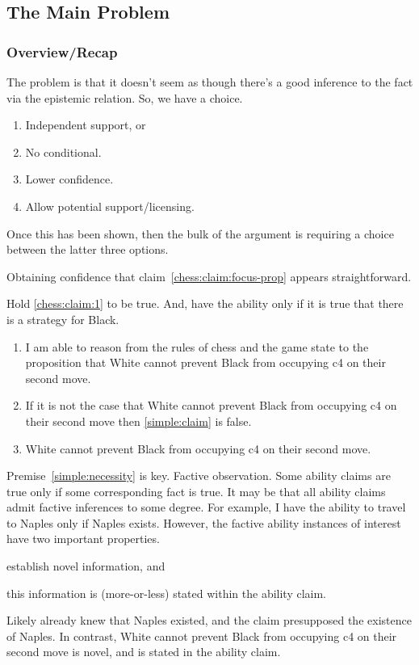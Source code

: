 \documentclass[10pt]{article}
\begin{document}
\subsection{The Main Problem}
\label{sec:problem}

\subsubsection{Overview/Recap}
\label{sec:overviewrecap}

\begin{note}[Overview]
  The problem is that it doesn't seem as though there's a good inference to the fact via the epistemic relation.
  So, we have a choice.
  \begin{enumerate}
  \item Independent support, or
  \item No conditional.
  \item Lower confidence.
  \item Allow potential support/licensing.
  \end{enumerate}
  Once this has been shown, then the bulk of the argument is requiring a choice between the latter three options.
\end{note}

Obtaining confidence that claim~\ref{chess:claim:focus-prop} appears straightforward.

Hold \ref{chess:claim:1} to be true.
And, have the ability only if it is true that there is a strategy for Black.

\begin{enumerate}
\item\label{simple:claim} I am able to reason from the rules of chess and the game state to the proposition that White cannot prevent Black from occupying c4 on their second move.
\item\label{simple:necessity} If it is not the case that White cannot prevent Black from occupying c4 on their second move then \ref{simple:claim} is false.
\item\label{simple:focus} White cannot prevent Black from occupying c4 on their second move.
\end{enumerate}

Premise~\ref{simple:necessity} is key.
Factive observation.
Some ability claims are true only if some corresponding fact is true.
It may be that all ability claims admit factive inferences to some degree.
For example, I have the ability to travel to Naples only if Naples exists.
However, the factive ability instances of interest have two important properties.
\begin{enumerate*}
\item establish novel information, and
\item this information is (more-or-less) stated within the ability claim.
\end{enumerate*}
Likely already knew that Naples existed, and the claim presupposed the existence of Naples.
In contrast, White cannot prevent Black from occupying c4 on their second move is novel, and is stated in the ability claim.
\end{document}
